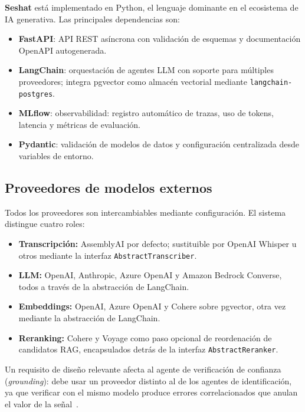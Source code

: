 \textbf{Seshat} está implementado en Python, el lenguaje dominante en el ecosistema de IA
generativa. Las principales dependencias son:

\begin{itemize}
  \item \textbf{FastAPI}: API REST asíncrona con validación de esquemas y documentación OpenAPI autogenerada.
  \item \textbf{LangChain}: orquestación de agentes LLM con soporte para múltiples proveedores; integra pgvector como almacén vectorial mediante \texttt{langchain-postgres}.
  \item \textbf{MLflow}: observabilidad: registro automático de trazas, uso de tokens, latencia y métricas de evaluación.
  \item \textbf{Pydantic}: validación de modelos de datos y configuración centralizada desde variables de entorno.
\end{itemize}

\subsection{Proveedores de modelos externos}

Todos los proveedores son intercambiables mediante configuración. El sistema distingue cuatro
roles:

\begin{itemize}
  \item \textbf{Transcripción:} AssemblyAI por defecto; sustituible por OpenAI Whisper u otros
        mediante la interfaz \texttt{AbstractTranscriber}.

  \item \textbf{LLM:} OpenAI, Anthropic, Azure OpenAI y Amazon Bedrock Converse, todos a través
        de la abstracción de LangChain.

  \item \textbf{Embeddings:} OpenAI, Azure OpenAI y Cohere sobre pgvector, otra vez mediante la
        abstracción de LangChain.

  \item \textbf{Reranking:} Cohere y Voyage como paso opcional de reordenación de candidatos
        RAG, encapsulados detrás de la interfaz \texttt{AbstractReranker}.
\end{itemize}

Un requisito de diseño relevante afecta al agente de verificación de confianza
(\textit{grounding}): debe usar un proveedor distinto al de los agentes de identificación, ya que
verificar con el mismo modelo produce errores correlacionados que anulan el valor de la
señal~\cite{zheng2023judging,cohen2023lmvslm}.

